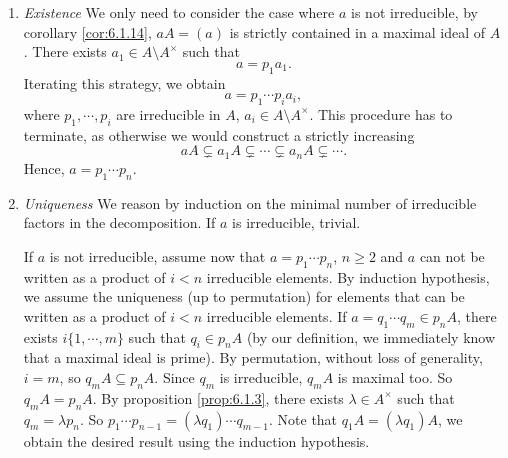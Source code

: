\begin{proofenv}
    \begin{enumerate}
        \item \textit{Existence}
            We only need to consider the case where $a$ is not irreducible, by corollary \ref{cor:6.1.14},
            $aA = (a)$ is strictly contained in a maximal ideal of $A$.
            There exists $a_1 \in A \setminus A^\times$ such that
            $$a = p_1 a_1.$$
            Iterating this strategy, we obtain
            $$a = p_1 \cdots p_i a_i,$$
            where $p_1,\cdots, p_i$ are irreducible in $A$, $a_i \in A \setminus A^\times$.
            This procedure has to terminate, as otherwise we would construct a strictly increasing
            $$aA \subsetneq a_1 A \subsetneq \cdots \subsetneq a_n A \subsetneq \cdots.$$
            Hence, $a = p_1 \cdots p_n$.
        \item \textit{Uniqueness}
            We reason by induction on the minimal number of irreducible factors in the decomposition.
            If $a$ is irreducible, trivial.

            \quad If $a$ is not irreducible,
            assume now that $a = p_1 \cdots p_n$, $n \ge 2$ and $a$ can not be written as a product of $i < n$ irreducible elements.
            By induction hypothesis,
            we assume the uniqueness (up to permutation) for elements that can be written as a product of $i < n$ irreducible elements.
            If $a = q_1 \cdots q_m \in p_n A$,
            there exists $i\{1,\cdots,m\}$ such that $q_i \in p_n A$ (by our definition, we immediately know that a maximal ideal is prime).
            By permutation, without loss of generality, $i = m$, so $q_m A \subseteq p_n A$.
            Since $q_m$ is irreducible, $q_m A$ is maximal too.
            So $q_m A = p_n A$.
            By proposition \ref{prop:6.1.3},
            there exists $\lambda \in A^\times$ such that $q_m = \lambda p_n$.
            So $p_1\cdots p_{n-1} = (\lambda q_1) \cdots q_{m-1}.$
            Note that $q_1 A = (\lambda q_1) A$,
            we obtain the desired result using the induction hypothesis.
    \end{enumerate}
\end{proofenv}

